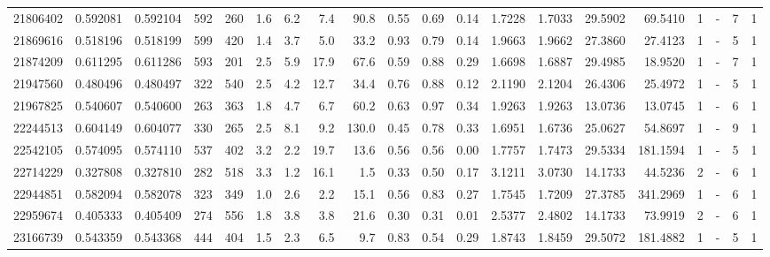 \begin{center}
\begin{tabular}{rccrrccrrrrrrrrrrlrr}
  21806402 & 0.592081 & 0.592104 &  592 &  260 &      1.6 &      6.2 &     7.4 &    90.8 &   0.55 &   0.69 &       0.14 &  1.7228 &  1.7033 &   29.5902 &   69.5410 &       1 &             - &        7 &         1 \\
  21869616 & 0.518196 & 0.518199 &  599 &  420 &      1.4 &      3.7 &     5.0 &    33.2 &   0.93 &   0.79 &       0.14 &  1.9663 &  1.9662 &   27.3860 &   27.4123 &       1 &             - &        5 &         1 \\
  21874209 & 0.611295 & 0.611286 &  593 &  201 &      2.5 &      5.9 &    17.9 &    67.6 &   0.59 &   0.88 &       0.29 &  1.6698 &  1.6887 &   29.4985 &   18.9520 &       1 &             - &        7 &         1 \\
  21947560 & 0.480496 & 0.480497 &  322 &  540 &      2.5 &      4.2 &    12.7 &    34.4 &   0.76 &   0.88 &       0.12 &  2.1190 &  2.1204 &   26.4306 &   25.4972 &       1 &             - &        5 &         1 \\
  21967825 & 0.540607 & 0.540600 &  263 &  363 &      1.8 &      4.7 &     6.7 &    60.2 &   0.63 &   0.97 &       0.34 &  1.9263 &  1.9263 &   13.0736 &   13.0745 &       1 &             - &        6 &         1 \\
  22244513 & 0.604149 & 0.604077 &  330 &  265 &      2.5 &      8.1 &     9.2 &   130.0 &   0.45 &   0.78 &       0.33 &  1.6951 &  1.6736 &   25.0627 &   54.8697 &       1 &             - &        9 &         1 \\
  22542105 & 0.574095 & 0.574110 &  537 &  402 &      3.2 &      2.2 &    19.7 &    13.6 &   0.56 &   0.56 &       0.00 &  1.7757 &  1.7473 &   29.5334 &  181.1594 &       1 &             - &        5 &         1 \\
  22714229 & 0.327808 & 0.327810 &  282 &  518 &      3.3 &      1.2 &    16.1 &     1.5 &   0.33 &   0.50 &       0.17 &  3.1211 &  3.0730 &   14.1733 &   44.5236 &       2 &             - &        6 &         1 \\
  22944851 & 0.582094 & 0.582078 &  323 &  349 &      1.0 &      2.6 &     2.2 &    15.1 &   0.56 &   0.83 &       0.27 &  1.7545 &  1.7209 &   27.3785 &  341.2969 &       1 &             - &        6 &         1 \\
  22959674 & 0.405333 & 0.405409 &  274 &  556 &      1.8 &      3.8 &     3.8 &    21.6 &   0.30 &   0.31 &       0.01 &  2.5377 &  2.4802 &   14.1733 &   73.9919 &       2 &             - &        6 &         1 \\
  23166739 & 0.543359 & 0.543368 &  444 &  404 &      1.5 &      2.3 &     6.5 &     9.7 &   0.83 &   0.54 &       0.29 &  1.8743 &  1.8459 &   29.5072 &  181.4882 &       1 &             - &        5 &         1 \\

\end{tabular}
\end{center}
